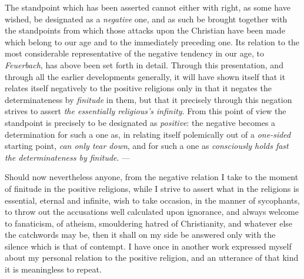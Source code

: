 \documentclass[12pt,a4paper]{book}
\begin{document}
\begin{enumerate}[label=\arabic*., leftmargin=*, labelsep=1em,
                  topsep=0.35\baselineskip, itemsep=0.35\baselineskip]
  The standpoint which has been asserted cannot either with right, as some have
  wished, be designated as a \emph{negative} one, and as such be brought
  together with the standpoints from which those attacks upon the Christian have
  been made which belong to our age and to the immediately preceding one. Its
  relation to the most considerable representative of the negative tendency in
  our age, to \emph{Feuerbach}, has above been set forth in detail. Through this
  presentation, and through all the earlier developments generally, it will have
  shown itself that it relates itself negatively to the positive religions only
  in that it negates the determinateness by \emph{finitude} in them, but that it
  precisely through this negation strives to assert \emph{the essentially
  religious's infinity}. From this point of view the standpoint is precisely to
  be designated as \emph{positive}: the negative
  becomes a determination for such a one as, in relating itself polemically out
  of a \emph{one-sided} starting point, \emph{can only tear down}, and for such
  a one as \emph{consciously holds fast the determinateness by finitude}. ---

  Should now nevertheless anyone, from the negative relation I take to the
  moment of finitude in the positive religions, while I strive to assert what in
  the religions is essential, eternal and infinite, wish to take occasion, in
  the manner of sycophants, to throw out the accusations well calculated upon
  ignorance, and always welcome to fanaticism, of atheism, smouldering hatred of
  Christianity, and whatever else the catchwords may be, then it shall on my
  side be answered only with the silence which is that of contempt. I have once
  in another work expressed myself about my personal relation to the positive
  religion, and an utterance of that kind it is meaningless to repeat.
\end{enumerate}
\end{document}
